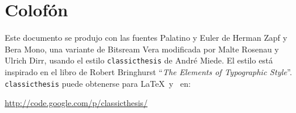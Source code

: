 \pagestyle{empty}

\hfill

\vfill


\section*{Colof\'on}
Este documento se produjo con las fuentes Palatino y Euler de Herman Zapf y Bera Mono, una variante de Bitsream Vera modificada por Malte Rosenau y Ulrich Dirr, usando el estilo \texttt{classicthesis} de Andr\'e Miede. 
El estilo está inspirado en el libro de Robert Bringhurst ``\emph{The Elements of Typographic Style}''. 
\texttt{classicthesis} puede obtenerse para \LaTeX\ y \mLyX\ en: 
\begin{center}
\url{http://code.google.com/p/classicthesis/}
\end{center}
 
\bigskip

\noindent\finalVersionString
